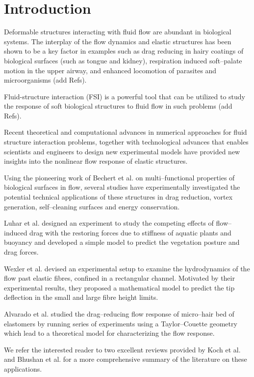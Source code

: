 \documentclass[preprint, letterpaper, nobibnotes, aps, superscriptaddress,prb]{revtex4-1}
\begin{document}
\section{Introduction}

Deformable structures interacting with fluid flow are abundant in biological systems. The interplay of the flow dynamics and elastic structures has been shown to be a key factor in examples such as drag reducing in hairy coatings of biological surfaces (such as tongue\cite{} and kidney\cite{}), respiration induced soft--palate motion in the upper airway, and enhanced locomotion of parasites and microorganisms (add Refs). 

Fluid-structure interaction (FSI) is a powerful tool that can be utilized to study the response of soft biological structures to fluid flow in such problems (add Refs).  

Recent theoretical and computational advances in numerical approaches for fluid structure interaction problems, together with technological advances that enables scientists and engineers to design new experimental models have provided new insights into the nonlinear flow response of elastic structures.

Using the pioneering work of Bechert et al. on multi--functional properties of biological surfaces in flow, several studies have experimentally investigated the potential technical applications of these structures in drag reduction, vortex generation, self--cleaning surfaces and energy conservation. 

Luhar et al. designed an experiment to study the competing effects of flow--induced drag with the restoring forces due to stiffness of aquatic plants and buoyancy and developed a simple model to predict the vegetation posture and drag forces.

Wexler et al. devised an experimental setup to examine the hydrodynamics of the flow past elastic fibres, confined in a rectangular channel. Motivated by their experimental results, they proposed a mathematical model to predict the tip deflection in the small and large fibre height limits.

Alvarado et al. studied the drag--reducing flow response of micro--hair bed of elastomers by running series of experiments using a Taylor--Couette geometry which lead to a theoretical model for characterizing the flow response. 

We refer the interested reader to two excellent reviews provided by Koch et al. and Bhushan et al. for a more comprehensive summary of the literature on these applications.
\end{document}
